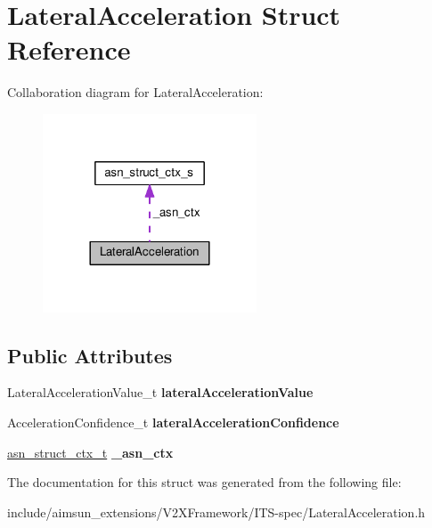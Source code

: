 \hypertarget{structLateralAcceleration}{}\section{Lateral\+Acceleration Struct Reference}
\label{structLateralAcceleration}


Collaboration diagram for Lateral\+Acceleration\+:\nopagebreak
\begin{figure}[H]
\begin{center}
\leavevmode
\includegraphics[width=180pt]{structLateralAcceleration__coll__graph}
\end{center}
\end{figure}
\subsection*{Public Attributes}
\begin{DoxyCompactItemize}
\item 
Lateral\+Acceleration\+Value\+\_\+t {\bfseries lateral\+Acceleration\+Value}\hypertarget{structLateralAcceleration_a8a1621af5cac483dae6c75265284ca26}{}\label{structLateralAcceleration_a8a1621af5cac483dae6c75265284ca26}

\item 
Acceleration\+Confidence\+\_\+t {\bfseries lateral\+Acceleration\+Confidence}\hypertarget{structLateralAcceleration_a880211cd20d51383b7ce7cec14d9a2cb}{}\label{structLateralAcceleration_a880211cd20d51383b7ce7cec14d9a2cb}

\item 
\hyperlink{structasn__struct__ctx__s}{asn\+\_\+struct\+\_\+ctx\+\_\+t} {\bfseries \+\_\+asn\+\_\+ctx}\hypertarget{structLateralAcceleration_a89680f60335c9cfc007eaa4c3d7686e8}{}\label{structLateralAcceleration_a89680f60335c9cfc007eaa4c3d7686e8}

\end{DoxyCompactItemize}


The documentation for this struct was generated from the following file\+:\begin{DoxyCompactItemize}
\item 
include/aimsun\+\_\+extensions/\+V2\+X\+Framework/\+I\+T\+S-\/spec/Lateral\+Acceleration.\+h\end{DoxyCompactItemize}
